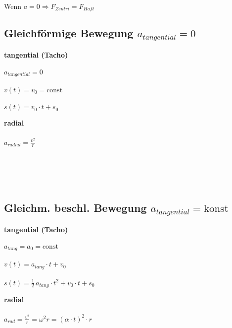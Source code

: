 		Wenn $a = 0 \Rightarrow F_{Zentri} = F_{Haft} $

	\subsection{Gleichförmige Bewegung $a_{tangential} = 0$}
	
		\begin{minipage}{0.6\linewidth}
			\textbf{tangential (Tacho)} \\
				\\
				$a_{tangential} = 0$ \\
				\\
				$v(t) = v_0 = \text{const}$ \\
				\\
				$s(t) = v_0 \cdot t + s_0$ \\
		\end{minipage}
		\hfill
		\begin{minipage}{0.35\linewidth}
			\textbf{radial} \\
				\\
				$a_{radial} = \frac{v^2}{r}$ \\
				\\
				\\
				\\
				\\
		\end{minipage}

	\subsection{Gleichm. beschl. Bewegung $a_{tangential} = \text{konst}$}		
		\begin{minipage}{0.45\linewidth}
			\textbf{tangential (Tacho)} \\
				\\
				$a_{tang} = a_0 = \text{const}$ \\
				\\
				$v(t) = a_{tang} \cdot t + v_0 $ \\
				\\
				$s(t) = \frac{1}{2} \, a_{tang} \cdot t^2 +  v_0 \cdot t + s_0$ \\
		\end{minipage}
		\hfill
		\begin{minipage}{0.5\linewidth}
			\textbf{radial} \\
				\\
				$a_{rad} = \frac{v^2}{r} = \omega^2r = (\alpha \cdot t)^2 \cdot r$\\
				\\
				\\
				\\
				\\
		\end{minipage}

